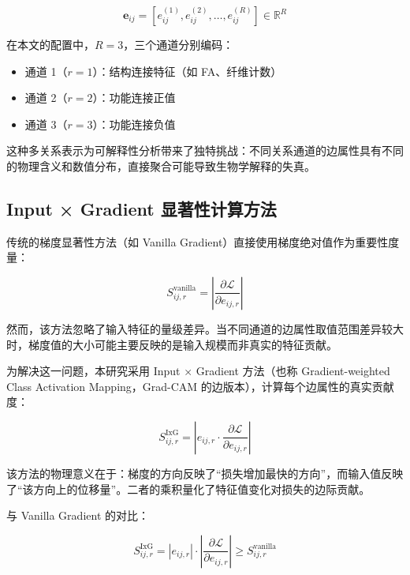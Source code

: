 \documentclass[UTF8, a4paper, 12pt]{article}
\begin{document}
\begin{equation}
\mathbf{e}_{ij} = [e_{ij}^{(1)}, e_{ij}^{(2)}, \ldots, e_{ij}^{(R)}] \in \mathbb{R}^R
\end{equation}

在本文的配置中，$R = 3$，三个通道分别编码：
\begin{itemize}
    \item 通道 1（$r=1$）：结构连接特征（如 FA、纤维计数）
    \item 通道 2（$r=2$）：功能连接正值
    \item 通道 3（$r=3$）：功能连接负值
\end{itemize}

这种多关系表示为可解释性分析带来了独特挑战：不同关系通道的边属性具有不同的物理含义和数值分布，直接聚合可能导致生物学解释的失真。

\subsection{Input × Gradient 显著性计算方法}

传统的梯度显著性方法（如 Vanilla Gradient）直接使用梯度绝对值作为重要性度量：

\begin{equation}
S_{ij,r}^{\text{vanilla}} = \left| \frac{\partial \mathcal{L}}{\partial e_{ij,r}} \right|
\end{equation}

然而，该方法忽略了输入特征的量级差异。当不同通道的边属性取值范围差异较大时，梯度值的大小可能主要反映的是输入规模而非真实的特征贡献。

为解决这一问题，本研究采用 Input × Gradient 方法（也称 Gradient-weighted Class Activation Mapping，Grad-CAM 的边版本），计算每个边属性的真实贡献度：

\begin{equation}
S_{ij,r}^{\text{IxG}} = \left| e_{ij,r} \cdot \frac{\partial \mathcal{L}}{\partial e_{ij,r}} \right|
\end{equation}

该方法的物理意义在于：梯度的方向反映了``损失增加最快的方向''，而输入值反映了``该方向上的位移量''。二者的乘积量化了特征值变化对损失的边际贡献。

与 Vanilla Gradient 的对比：

\begin{equation}
S_{ij,r}^{\text{IxG}} = |e_{ij,r}| \cdot \left| \frac{\partial \mathcal{L}}{\partial e_{ij,r}} \right| \geq S_{ij,r}^{\text{vanilla}}
\end{equation}
\end{document}
